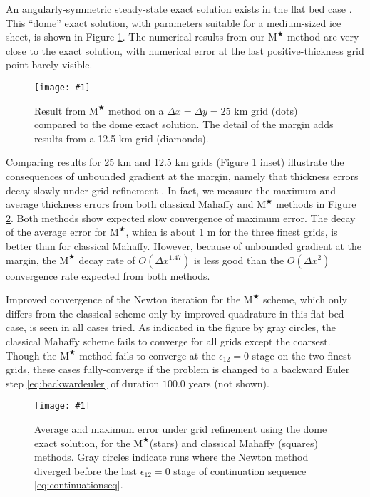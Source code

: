 \documentclass[twocolumn,letterpaper]{igs}
\newcommand{\onecol}[1]{\texttt{[image: \#1]}}
\newcommand\eps{\epsilon}
\newcommand{\Mstar}{$\text{M}^{\bigstar}$\xspace}
\begin{document}
An angularly-symmetric steady-state exact solution exists in the flat bed case \citep{Bueler2003,vanderVeen2013}.  This ``dome'' exact solution, with parameters suitable for a medium-sized ice sheet, is shown in Figure \ref{fig:domeprofile}.  The numerical results from our \Mstar method are very close to the exact solution, with numerical error at the last positive-thickness grid point barely-visible.

\begin{figure}[ht]
\onecol{domeprofile.pdf}
\caption{Result from \Mstar method on a $\Delta x=\Delta y=25$ km grid (dots) compared to the dome exact solution.  The detail of the margin adds results from a 12.5 km grid  (diamonds).}
\label{fig:domeprofile}
\end{figure}

Comparing results for 25 km and 12.5 km grids (Figure \ref{fig:domeprofile} inset) illustrate the consequences of unbounded gradient at the margin, namely that thickness errors decay slowly under grid refinement \citep{Bueleretal2005}.  In fact, we measure the maximum and average thickness errors from both classical Mahaffy and \Mstar methods in Figure \ref{fig:domeverif}.  Both methods show expected slow convergence of maximum error.  The decay of the average error for \Mstar, which is about 1 m for the three finest grids, is better than for classical Mahaffy.  However, because of unbounded gradient at the margin, the \Mstar decay rate of $O(\Delta x^{1.47})$ is less good than the $O(\Delta x^2)$ convergence rate expected from both methods.

Improved convergence of the Newton iteration for the \Mstar scheme, which only differs from the classical scheme only by improved quadrature in this flat bed case, is seen in all cases tried.  As indicated in the figure by gray circles, the classical Mahaffy scheme fails to converge for all grids except the coarsest.  Though the \Mstar method fails to converge at the $\eps_{12}=0$ stage on the two finest grids, these cases fully-converge if the problem is changed to a backward Euler step \eqref{eq:backwardeuler} of duration $100.0$ years (not shown).

\begin{figure}[ht]
\onecol{domeverif.pdf}
\caption{Average and maximum error under grid refinement using the dome exact solution, for the \Mstar (stars) and classical Mahaffy (squares) methods.  Gray circles indicate runs where the Newton method diverged before the last $\eps_{12}=0$ stage of continuation sequence \eqref{eq:continuationseq}.}
\label{fig:domeverif}
\end{figure}
\end{document}
